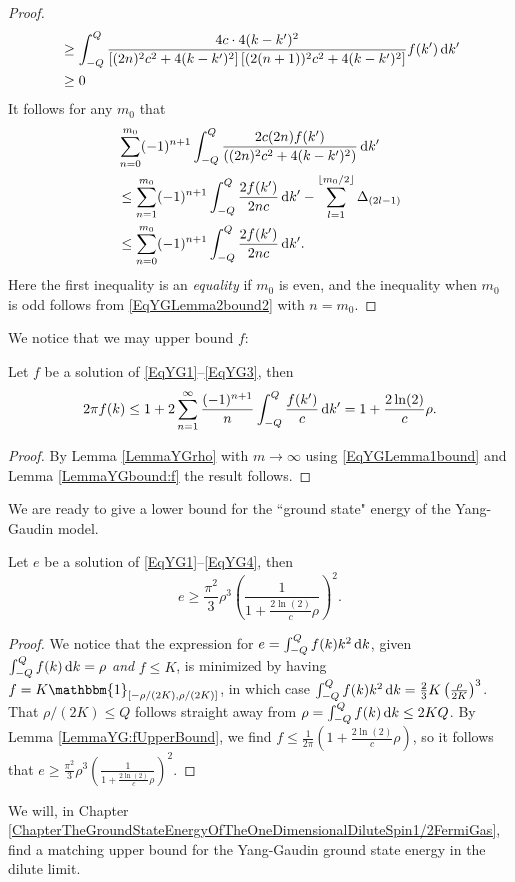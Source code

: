 \begin{proof}
\begin{equation}
\begin{aligned}
&\geq \int_{-Q}^{Q}\frac{4c\cdot 4(k-k')^2}{\left[(2n)^2c^2+4(k-k')^2\right]\left[(2(n+1))^2c^2+4(k-k')^2\right]} f(k')\mathop{}\!\mathrm{d} k'\\
&\geq 0
\end{aligned}
\end{equation}
It follows for any $ m_0 $ that \begin{equation}
\begin{aligned}
&\sum_{n=0}^{m_0}(-1)^{n+1}\int_{-Q}^{Q}\frac{2c(2n) f(k')}{((2n)^2c^2+4(k-k')^2)}\mathop{}\!\mathrm{d} k'\\
&\leq\sum_{n=1}^{m_0}(-1)^{n+1}\int_{-Q}^{Q}\frac{2 f(k')}{2nc}\mathop{}\!\mathrm{d} k'-\sum_{l=1}^{\left\lfloor m_0/2 \right\rfloor}\Delta_{(2l-1)}
\\
&\leq \sum_{n=0}^{m_0}(-1)^{n+1}\int_{-Q}^{Q}\frac{2 f(k')}{2nc}\mathop{}\!\mathrm{d} k'.
\end{aligned}
\end{equation}
Here the first inequality is an \emph{equality} if $ m_0 $ is even, and the inequality when $ m_0 $ is odd follows from \eqref{EqYGLemma2bound2} with $ n=m_0 $.
\end{proof}
 We notice that we may upper bound $ f $:
 \begin{lemma}\label{LemmaYG:fUpperBound}
 	Let $ f $ be a solution of \eqref{EqYG1}--\eqref{EqYG3}, then
 	\begin{equation}
 	\begin{aligned}
 	2\pi  f(k) \leq 1+2\sum_{n=1}^{\infty}\frac{(-1)^{n+1}}{n}\int_{-Q}^{Q}\frac{ f(k')}{c}\mathop{}\!\mathrm{d} k'=1+\frac{2\ln(2)}{c} \rho.
 	\end{aligned}
 	\end{equation}
 \end{lemma}
\begin{proof}
	By Lemma \ref{LemmaYGrho} with $ m\to\infty $ using \eqref{EqYGLemma1bound} and Lemma \ref{LemmaYGbound:f} the result follows. 
\end{proof}
We are ready to give a lower bound for the ``ground state" energy of the Yang-Gaudin model. 
\begin{proposition}\label{PropositionYGLowerBound}
	Let $ e $ be a solution of \eqref{EqYG1}--\eqref{EqYG4}, then\begin{equation}
	e\geq \frac{\pi^2}{3}\rho ^3\left(\frac{1}{1+\frac{2\ln(2)}{c}\rho}\right)^2.
	\end{equation}
\end{proposition}
\begin{proof}
	We notice that the expression for $ e=\int_{-Q}^{Q}f(k)k^2\mathop{}\!\mathrm{d} k $, given $ \int_{-Q}^{Q}f(k)\mathop{}\!\mathrm{d} k=\rho $ \emph{and} $ f\leq K $, is minimized by having $ f=K\mathbbm{1}_{[-\rho/(2K),\rho /(2K)]} $, in which case $ \int_{-Q}^{Q}f(k)k^2\mathop{}\!\mathrm{d} k=\frac{2}{3}K\left(\frac{\rho}{2K}\right)^3 $. That $ \rho/(2K)\leq Q $ follows straight away from $ \rho =\int_{-Q}^{Q}f(k)\mathop{}\!\mathrm{d} k \leq 2KQ $.
	By Lemma \ref{LemmaYG:fUpperBound}, we find $ f\leq \frac{1}{2\pi}\left(1+\frac{2\ln(2)}{c}\rho\right) $, so it follows that $ e\geq \frac{\pi^2}{3}\rho ^3\left(\frac{1}{1+\frac{2\ln(2)}{c}\rho}\right)^2 $.
\end{proof}
We will, in Chapter \ref{ChapterTheGroundStateEnergyOfTheOneDimensionalDiluteSpin1/2FermiGas}, find a matching upper bound for the Yang-Gaudin ground state energy in the dilute limit.

